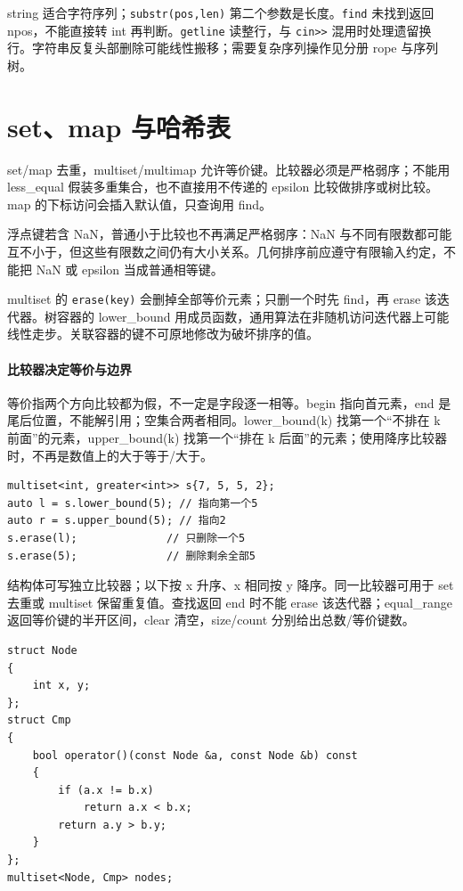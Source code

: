 string 适合字符序列；\texttt{substr(pos,len)} 第二个参数是长度。\texttt{find} 未找到返回 npos，不能直接转 int 再判断。\texttt{getline} 读整行，与 \texttt{cin>>} 混用时处理遗留换行。字符串反复头部删除可能线性搬移；需要复杂序列操作见分册 rope 与序列树。

\section{set、map 与哈希表}
set/map 去重，multiset/multimap 允许等价键。比较器必须是严格弱序；不能用 less\_equal 假装多重集合，也不直接用不传递的 epsilon 比较做排序或树比较。map 的下标访问会插入默认值，只查询用 find。

浮点键若含 NaN，普通小于比较也不再满足严格弱序：NaN 与不同有限数都可能互不小于，但这些有限数之间仍有大小关系。几何排序前应遵守有限输入约定，不能把 NaN 或 epsilon 当成普通相等键。

multiset 的 \texttt{erase(key)} 会删掉全部等价元素；只删一个时先 find，再 erase 该迭代器。树容器的 lower\_bound 用成员函数，通用算法在非随机访问迭代器上可能线性走步。关联容器的键不可原地修改为破坏排序的值。

\paragraph{比较器决定等价与边界}
等价指两个方向比较都为假，不一定是字段逐一相等。begin 指向首元素，end 是尾后位置，不能解引用；空集合两者相同。lower\_bound(k) 找第一个“不排在 k 前面”的元素，upper\_bound(k) 找第一个“排在 k 后面”的元素；使用降序比较器时，不再是数值上的大于等于/大于。
\begin{lstlisting}
multiset<int, greater<int>> s{7, 5, 5, 2};
auto l = s.lower_bound(5); // 指向第一个5
auto r = s.upper_bound(5); // 指向2
s.erase(l);              // 只删除一个5
s.erase(5);              // 删除剩余全部5
\end{lstlisting}
结构体可写独立比较器；以下按 x 升序、x 相同按 y 降序。同一比较器可用于 set 去重或 multiset 保留重复值。查找返回 end 时不能 erase 该迭代器；equal\_range 返回等价键的半开区间，clear 清空，size/count 分别给出总数/等价键数。
\begin{lstlisting}
struct Node
{
    int x, y;
};
struct Cmp
{
    bool operator()(const Node &a, const Node &b) const
    {
        if (a.x != b.x)
            return a.x < b.x;
        return a.y > b.y;
    }
};
multiset<Node, Cmp> nodes;
\end{lstlisting}

